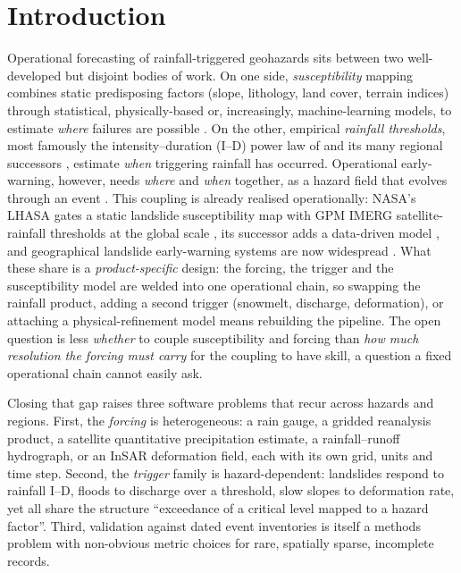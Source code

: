 \documentclass[authoryear,preprint,review,12pt]{elsarticle}
\begin{document}
\linenumbers

\section{Introduction}

Operational forecasting of rainfall-triggered geohazards sits between two
well-developed but disjoint bodies of work. On one side, \emph{susceptibility}
mapping combines static predisposing factors (slope, lithology, land cover,
terrain indices) through statistical, physically-based or, increasingly,
machine-learning models, to estimate \emph{where} failures are possible
\citep{reichenbach2018,merghadi2020}. On the other, empirical \emph{rainfall thresholds}, most
famously the intensity--duration (I--D) power law of \citet{caine1980} and its
many regional successors \citep{guzzetti2007,segoni2018,gariano2016}, estimate \emph{when}
triggering rainfall has occurred. Operational early-warning, however, needs
\emph{where} and \emph{when} together, as a hazard field that evolves through an
event \citep{bogaard2018}. This coupling is already realised operationally: NASA's
LHASA gates a static landslide susceptibility map with GPM IMERG satellite-rainfall
thresholds at the global scale \citep{kirschbaum2018}, its successor adds a
data-driven model \citep{stanley2021}, and geographical landslide early-warning
systems are now widespread \citep{guzzetti2020}. What these share is a
\emph{product-specific} design: the forcing, the trigger and the susceptibility
model are welded into one operational chain, so swapping the rainfall product,
adding a second trigger (snowmelt, discharge, deformation), or attaching a
physical-refinement model means rebuilding the pipeline. The open question is less
\emph{whether} to couple susceptibility and forcing than \emph{how much resolution
the forcing must carry} for the coupling to have skill, a question a fixed
operational chain cannot easily ask.

Closing that gap raises three software problems that recur across hazards and
regions. First, the \emph{forcing} is heterogeneous: a rain gauge, a gridded
reanalysis product, a satellite quantitative precipitation estimate, a
rainfall--runoff hydrograph, or an InSAR deformation field, each with its own
grid, units and time step. Second, the \emph{trigger} family is hazard-dependent:
landslides respond to rainfall I--D, floods to discharge over a threshold, slow
slopes to deformation rate, yet all share the structure ``exceedance of a
critical level mapped to a hazard factor''. Third, validation against dated event
inventories is itself a methods problem with non-obvious metric choices for rare,
spatially sparse, incomplete records.
\end{document}
